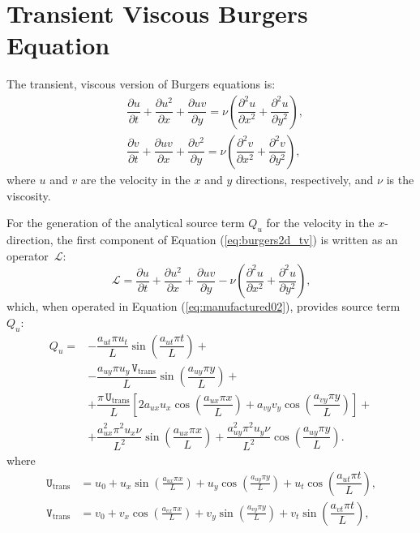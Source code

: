 \documentclass[10pt]{article}
\newcommand{\diff}[2] {\dfrac{\partial #1}{\partial #2}}
\newcommand{\Lo}{\,\mathcal{L}}
\newcommand{\U}{\,\mathtt{U}}
\newcommand{\V}{\,\mathtt{V}}
\begin{document}
\section{Transient Viscous Burgers Equation}

The transient, viscous version of Burgers equations is:
\begin{equation}
 \label{eq:burgers2d_tv}
\begin{split}
 &\diff{ u}{t} + \diff{ u^2 }{x}+\diff{uv}{y}=\nu \left( \diff{^2u}{ x^2}+ \diff{^2u }{y^2}\right),\\
&\diff{ v}{t}+ \diff{ u v}{x} + \diff{  v^2 }{y}=\nu \left( \diff{^2v}{ x^2}+ \diff{^2v }{y^2}\right),
\end{split}
\end{equation}
%
where $u$ and $v$ are the velocity in the  $x$ and $y$  directions, respectively, and $\nu$ is the viscosity.


For the generation of the analytical source term $Q_u$ for the velocity in the $x$-direction, the first component of Equation  (\ref{eq:burgers2d_tv}) is written as an  operator $\Lo$:
\begin{equation*}
 \label{eq:burgers2d_12}
\Lo=\diff{ u}{t} + \diff{ u^2 }{x}+\diff{uv}{y}-\nu \left( \diff{^2u}{ x^2}+ \diff{^2u }{y^2}\right),
\end{equation*}
which, when operated in Equation (\ref{eq:manufactured02}), provides source term $Q_{u}$:
\begin{equation}
\begin{split}\label{sourceQu_complete}
Q_u = &- \dfrac{a_{ut} \pi u_t}{L}\sin\left(\dfrac{a_{ut} \pi t}{L}\right)+\\
 &-\dfrac{a_{uy} \pi u_y \V_\text{trans} }{L}\sin\left(\dfrac{a_{uy} \pi y}{L}\right)+\\
 &+\dfrac{\pi \U_\text{trans}}{L}\left[2 a_{ux} u_x \cos\left(\dfrac{a_{ux} \pi x}{L}\right)+a_{vy} v_y \cos\left(\dfrac{a_{vy} \pi y}{L}\right)\right] +\\ &+ \dfrac{a_{ux}^2 \pi^2 u_x \nu}{L^2}\sin\left(\dfrac{a_{ux} \pi x}{L}\right)+ \dfrac{a_{uy}^2 \pi^2 u_y \nu}{L^2}\cos\left(\dfrac{a_{uy} \pi y}{L}\right).
\end{split}
 \end{equation}
where
\begin{equation}
 \begin{split} \label{aux_var_transient}
  \U_\text{trans} &= u_{0}+u_{x} \sin\left(\frac{a_{u x} \pi x}{L}\right)+u_{y} \cos\left(\frac{a_{u y} \pi y}{L}\right) + u_t \cos\left(\dfrac{a_{u t} \pi t}{L}\right),\\
\V_\text{trans} &= v_{0}+v_{x} \cos\left(\frac{a_{v x} \pi x}{L}\right)+v_{y} \sin\left(\frac{a_{v y} \pi y}{L}\right)+ v_t \sin\left(\dfrac{a_{v t} \pi t}{L}\right),\\
 \end{split}
\end{equation}
\end{document}
